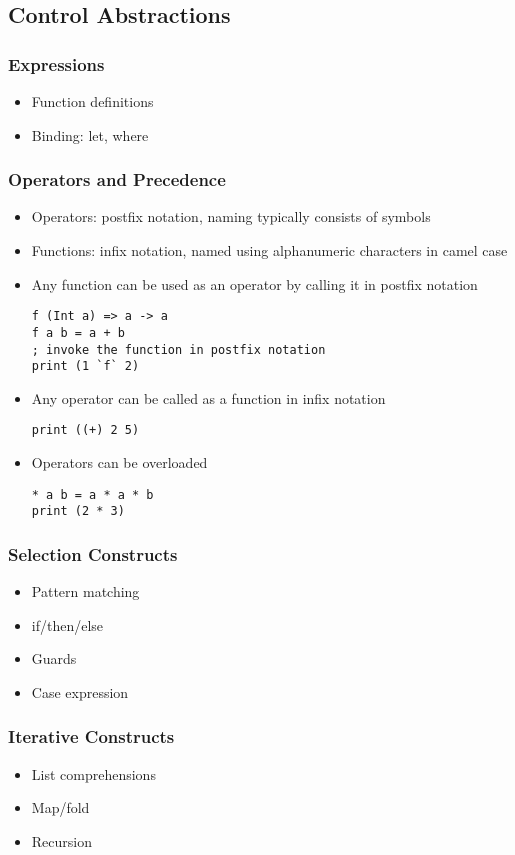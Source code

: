 \documentclass[titlepage,12pt]{article}
\newcommand{\bi}{\begin{itemize}}
\newcommand{\ei}{\end{itemize}}
\begin{document}
\subsection{Control Abstractions}
\subsubsection{Expressions}
\bi
    \item Function definitions
    \item Binding: let, where
\ei

\subsubsection{Operators and Precedence}
\bi
    \item Operators: postfix notation, naming typically consists of symbols
    \item Functions: infix notation, named using alphanumeric characters in camel case
    \item Any function can be used as an operator by calling it in postfix notation
\begin{verbatim}
f (Int a) => a -> a
f a b = a + b
; invoke the function in postfix notation
print (1 `f` 2)
\end{verbatim}
    \item Any operator can be called as a function in infix notation
\begin{verbatim}
print ((+) 2 5)
\end{verbatim}
    \item Operators can be overloaded
\begin{verbatim}
* a b = a * a * b
print (2 * 3)
\end{verbatim}
\ei

\subsubsection{Selection Constructs}
\bi
    \item Pattern matching
    \item if/then/else
    \item Guards
    \item Case expression
\ei

\subsubsection{Iterative Constructs}
\bi
    \item List comprehensions
    \item Map/fold
    \item Recursion
\ei
\end{document}
